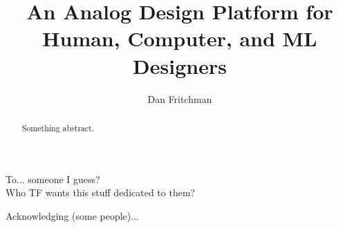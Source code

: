 \documentclass{ucbthesis}
\begin{document}
\title{An Analog Design Platform for Human, Computer, and ML Designers}
\author{Dan Fritchman}

\maketitle
\copyrightpage

\begin{abstract}
Something abstract. 
\end{abstract}


\begin{frontmatter}

\begin{dedication}
\null\vfil
\begin{center}
To... someone I guess?\\\vspace{12pt}
Who TF wants this stuff dedicated to them? 
\end{center}
\vfil\null
\end{dedication}


\tableofcontents
\clearpage
\listoffigures
\clearpage
\listoftables

\begin{acknowledgements}
Acknowledging (some people)...
\end{acknowledgements}

\end{frontmatter}

\pagestyle{headings}

\begin{markdown}



\end{markdown}

\printbibliography
\end{document}

